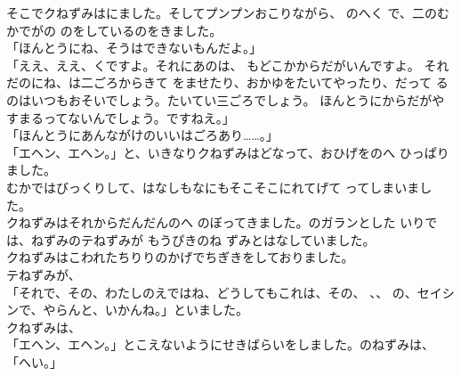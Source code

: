 \documentclass[
a4paper,
10pt,
book]
{tarticle}
\begin{document}
\newpage
\thispagestyle{fancy}
\fancyhead[C]{\empty}
\indent そこでクねずみはにました。そしてプンプンおこりながら、
のへく
で、二のむかでがの
のをしているのをきました。\\
「ほんとうにね、そうはできないもんだよ。」\\
「ええ、ええ、くですよ。それにあのは、
もどこかからだがいんですよ。
それだのにね、は二ごろからきて
をませたり、おかゆをたいてやったり、だって
るのはいつもおそいでしょう。たいてい三ごろでしょう。
ほんとうにからだがやすまるってないんでしょう。ですねえ。」\\
「ほんとうにあんながけのいいはごろあり……。」\\
「エヘン、エヘン。」と、いきなりクねずみはどなって、おひげをのへ
ひっぱりました。\\
\indent むかではびっくりして、はなしもなにもそこそこにれてげて
ってしまいました。\\
\indent クねずみはそれからだんだんのへ
のぼってきました。のガランとした
いりでは、ねずみのテねずみが
もうぴきのね
ずみとはなしていました。\\
\indent クねずみはこわれたちりりのかげでちぎきをしておりました。\\
\indent テねずみが、\\
「それで、その、わたしのえではね、どうしてもこれは、その、
、、
の、セイシンで、やらんと、いかんね。」といました。\\
\indent クねずみは、\\
「エヘン、エヘン。」とこえないようにせきばらいをしました。のねずみは、
「へい。」
\newpage
\thispagestyle{fancy}
\fancyhead[R]{\empty}
\end{document}
